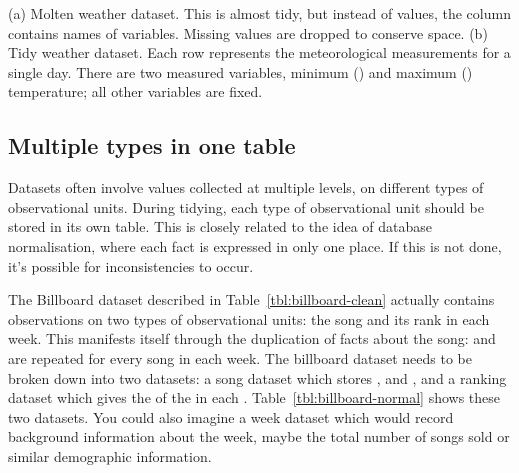 \documentclass[article]{jss}
\begin{document}
\begin{table}[htbp]
  \centering
  \hspace{2em}%

  \caption{(a) Molten weather dataset. This is almost tidy, but instead of values, the  column contains names of variables. Missing values are dropped to conserve space. (b) Tidy weather dataset. Each row represents the meteorological measurements for a single day. There are two measured variables, minimum () and maximum () temperature; all other variables are fixed.}
  \label{tbl:weather-clean}
\end{table}

\subsection{Multiple types in one table}
\label{sub:multiple-types}

Datasets often involve values collected at multiple levels, on different types of observational units. During tidying, each type of observational unit should be stored in its own table. This is closely related to the idea of database normalisation, where each fact is expressed in only one place. If this is not done, it's possible for inconsistencies to occur. 


The Billboard dataset described in Table~\ref{tbl:billboard-clean} actually contains observations on two types of observational units: the song and its rank in each week. This manifests itself through the duplication of facts about the song:  and  are repeated for every song in each week. The billboard dataset needs to be broken down into two datasets: a song dataset which stores ,  and , and a ranking dataset which gives the  of the  in each . Table~\ref{tbl:billboard-normal} shows these two datasets. You could also imagine a week dataset which would record background information about the week, maybe the total number of songs sold or similar demographic information.
\end{document}
